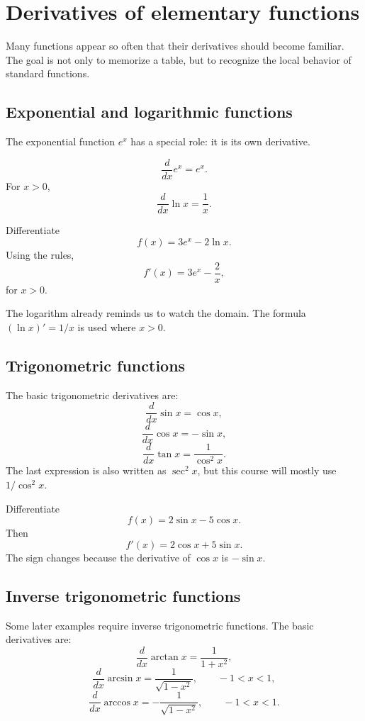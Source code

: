 \section{Derivatives of elementary functions}

Many functions appear so often that their derivatives should become familiar. The goal is not only to memorize a table, but to recognize the local behavior of standard functions.

\subsection*{Exponential and logarithmic functions}

The exponential function \(e^x\) has a special role: it is its own derivative.

\begin{theorembox}
\[
\frac{d}{dx}e^x=e^x.
\]
For \(x>0\),
\[
\frac{d}{dx}\ln x=\frac1x.
\]
\end{theorembox}

\begin{examplebox}
Differentiate
\[
f(x)=3e^x-2\ln x.
\]
Using the rules,
\[
f'(x)=3e^x-\frac{2}{x},
\]
for \(x>0\).
\end{examplebox}

The logarithm already reminds us to watch the domain. The formula \((\ln x)'=1/x\) is used where \(x>0\).

\subsection*{Trigonometric functions}

The basic trigonometric derivatives are:
\[
\frac{d}{dx}\sin x=\cos x,
\]
\[
\frac{d}{dx}\cos x=-\sin x,
\]
\[
\frac{d}{dx}\tan x=\frac{1}{\cos^2 x}.
\]
The last expression is also written as \(\sec^2 x\), but this course will mostly use \(1/\cos^2 x\).

\begin{examplebox}
Differentiate
\[
f(x)=2\sin x-5\cos x.
\]
Then
\[
f'(x)=2\cos x+5\sin x.
\]
The sign changes because the derivative of \(\cos x\) is \(-\sin x\).
\end{examplebox}

\subsection*{Inverse trigonometric functions}

Some later examples require inverse trigonometric functions. The basic derivatives are:
\[
\frac{d}{dx}\arctan x=\frac{1}{1+x^2},
\]
\[
\frac{d}{dx}\arcsin x=\frac{1}{\sqrt{1-x^2}},
\qquad -1<x<1,
\]
\[
\frac{d}{dx}\arccos x=-\frac{1}{\sqrt{1-x^2}},
\qquad -1<x<1.
\]

